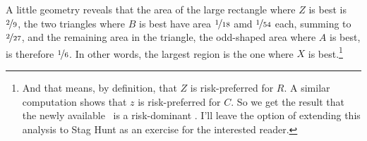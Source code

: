 \noindent A little geometry reveals that the area of the large rectangle where $Z$ is best is $\nicefrac{2}{9}$, the two triangles where $B$ is best have area $\nicefrac{1}{18}$ amd $\nicefrac{1}{54}$ each, summing to $\nicefrac{2}{27}$, and the remaining area in the triangle, the odd-shaped area where $A$ is best, is therefore $\nicefrac{1}{6}$. In other words, the largest region is the one where $X$ is best.\footnote{And that means, by definition, that $Z$ is risk-preferred for $R$. A similar computation shows that $z$ is risk-preferred for $C$. So we get the result that the newly available \eqm\ is a risk-dominant \eqm. I'll leave the option of extending this analysis to Stag Hunt as an exercise for the interested reader.}